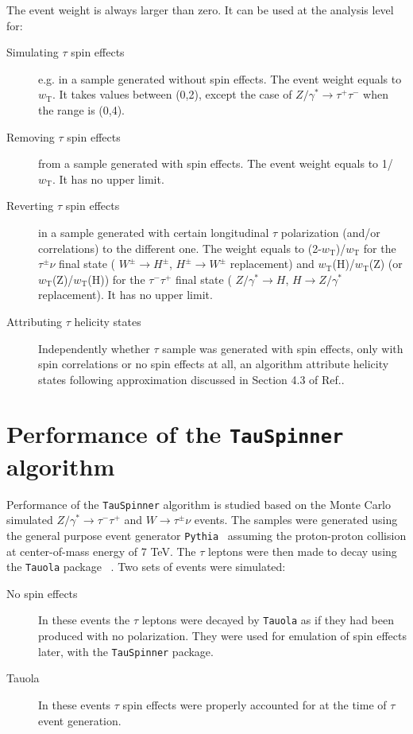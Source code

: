 \documentclass[12pt]{article}
\def\Wtaunu{\ensuremath{W\to\tau^{\pm}\nu}\xspace}
\def\Ztautau{\ensuremath{Z/\gamma^{*}\to\tau^{-}\tau^{+}}\xspace}
\def\TauNu{\ensuremath{\tau^{\pm}\nu}\xspace}
\def\TauTau{\ensuremath{\tau^{-}\tau^{+}}\xspace}
\def\Tau{\ensuremath{\tau}\xspace}
\begin{document}
The event weight is always larger than zero. It can be used at the analysis level for:
\begin{description}
\item[Simulating \Tau spin effects] e.g. in a sample generated
 without spin effects. The event weight equals to $w_\mathrm{T}$. 
 It takes values between (0,2), except the case of $Z/\gamma^* \to \tau^+\tau^-$ 
when the range is (0,4).
\item[Removing \Tau spin effects] from a sample generated
 with spin effects. The event weight equals to 1/$w_\mathrm{T}$. It 
 has no  upper limit.
\item[Reverting \Tau spin effects] in a sample generated
 with certain longitudinal \Tau polarization (and/or correlations) to
 the different one. The weight equals to 
 (2-$w_\mathrm{T}$)/$w_\mathrm{T}$ for the \TauNu final state ( $W^\pm \to H^\pm$, $H^\pm \to W^\pm$
replacement) and
 $w_\mathrm{T}$(H)/$w_\mathrm{T}$(Z) (or $w_\mathrm{T}$(Z)/$w_\mathrm{T}$(H))
 for the \TauTau final state ( $Z/\gamma^* \to H$, $H \to Z/\gamma^*$
replacement). It  has no  upper limit.
\item[Attributing \Tau helicity states] Independently whether $\tau$ sample
was generated with spin effects, only with spin correlations or 
no spin effects at all, an algorithm attribute helicity states following
approximation discussed in Section 4.3 of Ref.\cite{Davidson:2010rw}.
\end{description}



\section{Performance of the {\tt TauSpinner} algorithm}\label{sect:Perf}


Performance of the {\tt TauSpinner} algorithm is studied based on the
Monte Carlo simulated \Ztautau and \Wtaunu events.
The samples were generated using the general purpose event generator
{\tt Pythia}~\cite{PYTHIA} assuming the proton-proton collision at center-of-mass energy of 7 TeV.
The \Tau leptons were then made to decay using the {\tt Tauola} package ~\cite{TAUOLA1,TAUOLA2, TAUOLA3}.
Two sets of events were simulated:
\begin{description}
\item[No spin effects] In these events the \Tau leptons were decayed by {\tt Tauola} as if they had been produced with no
polarization. They were used for emulation of  spin effects later, with the {\tt TauSpinner} package. 
\item[Tauola] In these events \Tau spin effects were properly accounted for at the time of 
\Tau event generation.
\end{description}
\end{document}

